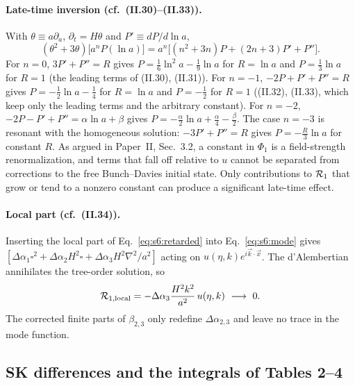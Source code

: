\documentclass[aps,prd,onecolumn,10pt,nofootinbib,floatfix]{revtex4-2}
\newcommand{\PII}{Paper~II}
\newcommand{\eqII}[1]{(II.#1)}
\begin{document}
\paragraph*{Late-time inversion (cf.\ \eqII{30}--\eqII{33}).}
With $\theta\equiv a\partial_a$, $\partial_t=H\theta$ and $P'\equiv dP/d\ln a$,
\begin{equation}
(\theta^2+3\theta)\big[a^nP(\ln a)\big]=a^n\big[(n^2+3n)P+(2n+3)P'+P''\big].
\label{eq:s6:theta}
\end{equation}
For $n=0$, $3P'+P''=R$ gives $P=\frac16\ln^2a-\frac19\ln a$ for $R=\ln a$ and $P=\frac13\ln a$ for $R=1$ (the leading terms of
\eqII{30}, \eqII{31}). For $n=-1$, $-2P+P'+P''=R$ gives $P=-\frac12\ln a-\frac14$ for $R=\ln a$ and $P=-\frac12$ for $R=1$
(\eqII{32}, \eqII{33}, which keep only the leading terms and the arbitrary constant). For $n=-2$,
$-2P-P'+P''=\alpha\ln a+\beta$ gives $P=-\frac\alpha2\ln a+\frac\alpha4-\frac\beta2$. The case $n=-3$ is resonant with
the homogeneous solution: $-3P'+P''=R$ gives $P=-\frac R3\ln a$ for constant $R$. As argued in \PII, Sec.~3.2, a
constant in $\Phi_1$ is a field-strength renormalization, and terms that fall off relative to $u$ cannot be separated from
corrections to the free Bunch--Davies initial state. Only contributions to $\mathcal{R}_1$ that grow or tend to a nonzero constant
can produce a significant late-time effect.

\paragraph*{Local part (cf.\ \eqII{34}).}
Inserting the local part of Eq.~\eqref{eq:s6:retarded} into Eq.~\eqref{eq:s6:mode} gives
$[\Delta\alpha_1\square^2+\Delta\alpha_2H^2\square+\Delta\alpha_3H^2\nabla^2/a^2]$ acting on $u(\eta,k)e^{i\vec k\cdot\vec x}$.
The d'Alembertian annihilates the tree-order solution, so
\begin{equation}
\mathcal{R}_{1,\rm local}=-\Delta\alpha_3\frac{H^2k^2}{a^2}\,u(\eta,k)\ \longrightarrow\ 0 .
\label{eq:s6:local}
\end{equation}
The corrected finite parts of $\beta_{2,3}$ only redefine $\Delta\alpha_{2,3}$ and leave no trace in the mode function.

\subsection{SK differences and the integrals of Tables 2--4}
\label{sec:s6:tab234}
\end{document}
